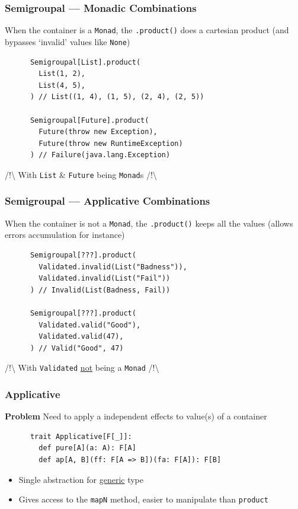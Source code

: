 \begin{frame}[fragile]
  \frametitle{Semigroupal --- Monadic Combinations}

  When the container is a \texttt{Monad}, the \texttt{.product()} does a cartesian product (and bypasses `invalid' values like \texttt{None})

  \begin{example}
    \begin{lstlisting}
      Semigroupal[List].product(
        List(1, 2),
        List(4, 5),
      ) // List((1, 4), (1, 5), (2, 4), (2, 5))
      
      Semigroupal[Future].product(
        Future(throw new Exception),
        Future(throw new RuntimeException)
      ) // Failure(java.lang.Exception)
    \end{lstlisting}
  \end{example}
  /!\textbackslash{} With \texttt{List} \& \texttt{Future} being \texttt{Monad}s /!\textbackslash{}
\end{frame}

\begin{frame}[fragile]
  \frametitle{Semigroupal --- Applicative Combinations}

  When the container is not a \texttt{Monad}, the \texttt{.product()} keeps all the values (allows errors accumulation for instance)
  \begin{example}
    \begin{lstlisting}
      Semigroupal[???].product(
        Validated.invalid(List("Badness")),
        Validated.invalid(List("Fail"))
      ) // Invalid(List(Badness, Fail))

      Semigroupal[???].product(
        Validated.valid("Good"),
        Validated.valid(47),
      ) // Valid("Good", 47)
    \end{lstlisting}
  \end{example}
  /!\textbackslash{} With \texttt{Validated} \ul{not} being a \texttt{Monad} /!\textbackslash{}
\end{frame}

\begin{frame}[fragile]
  \frametitle{Applicative}

  \textbf{Problem} Need to apply a independent effects to value(s) of a container

  \begin{definition}
    \begin{lstlisting}
      trait Applicative[F[_]]:
        def pure[A](a: A): F[A]
        def ap[A, B](ff: F[A => B])(fa: F[A]): F[B]
    \end{lstlisting}
  \end{definition}

  \begin{itemize}
    \item Single abstraction for \ul{generic} type
    \item Gives access to the \texttt{mapN} method, easier to manipulate than \texttt{product}
  \end{itemize}
\end{frame}

